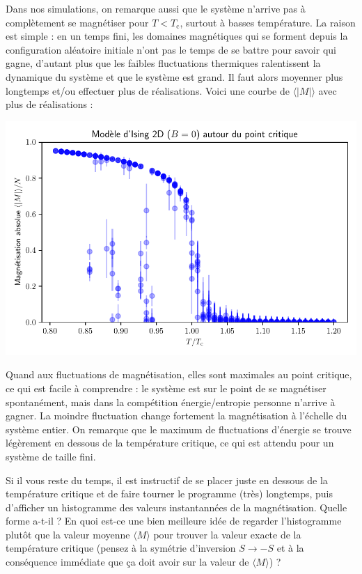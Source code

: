 \documentclass{book}
\begin{document}
\begin{correction}
Dans nos simulations, on remarque aussi que le système n'arrive pas à complètement se magnétiser pour $T < T_\text{c}$, surtout à basses température. La raison est simple : en un temps fini, les domaines magnétiques qui se forment depuis la configuration aléatoire initiale n'ont pas le temps de se battre pour savoir qui gagne, d'autant plus que les faibles fluctuations thermiques ralentissent la dynamique du système et que le système est grand. Il faut alors moyenner plus longtemps et/ou effectuer plus de réalisations. Voici une courbe de $\langle |M| \rangle$ avec plus de réalisations :\\
\begin{center}
\includegraphics[width=0.75\linewidth]{TD3/ising_stats_scanT_250x250_5e9steps_2runs.magnetisation.pdf}
\end{center}

Quand aux fluctuations de magnétisation, elles sont maximales au point critique, ce qui est facile à comprendre : le système est sur le point de se magnétiser spontanément, mais dans la compétition énergie/entropie personne n'arrive à gagner. La moindre fluctuation change fortement la magnétisation à l'échelle du système entier. On remarque que le maximum de fluctuations d'énergie se trouve légèrement en dessous de la température critique, ce qui est attendu pour un système de taille fini.
\end{correction}

Si il vous reste du temps, il est instructif de se placer juste en dessous de la température critique et de faire tourner le programme (très) longtemps, puis d'afficher un histogramme des valeurs instantannées de la magnétisation. Quelle forme a-t-il ? En quoi est-ce une bien meilleure idée de regarder l'histogramme plutôt que la valeur moyenne $\langle M \rangle$ pour trouver la valeur exacte de la température critique (pensez à la symétrie d'inversion $S \to -S$ et à la conséquence immédiate que ça doit avoir sur la valeur de $\langle M \rangle$) ?
\end{document}
